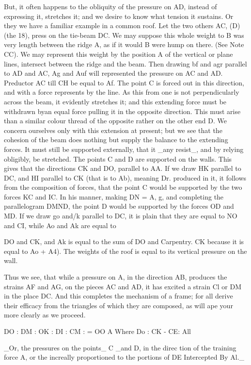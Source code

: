 \documentclass{article}
\begin{document}
But, it often happens to the obliquity of the pressure on AD, instead of expressing it, stretches it; and we desire to know what tension it sustains. Or they we have a familiar example in a common roof. Let the two others AC, (D) (the 18), press on the tie-beam DC. We may suppose this whole weight to B was very length between the ridge A, as if it would B were hump on there. (See Note CC). We may represent this weight by the position A of the vertical or plane lines, intersect between the ridge and the beam. Then drawing bf and agr parallel to AD and AC, Ag and Auf will represented the pressure on AC and AD. Preductor AC till CH be equal to Af. The point C is forced out in this direction, and with a force represents by the line. As this from one is not perpendicularly across the beam, it evidently stretches it; and this extending force must be withdrawn byan equal force pulling it in the opposite direction. This must arise than a similar colour thread of the opposite rather on the other end D. We concern ourselves only with this extension at present; but we see that the cohesion of the beam does nothing but supply the balance to the extending forces. It must still be supported externally, that it \_any resist\_, and by relying obligibly, be stretched. The points C and D are supported on the walls. This gives that the directions CK and DO, parallel to AA. If we draw HK parallel to DC, and HI parallel to CK (that is to Ab), meaning Dr. produced in it, it follows from the composition of forces, that the point C would be supported by the two forces KC and IC. In his manner, making DN = A, g, and completing the parallelogram DMND, the point D would be supported by the forces OD and MD. If we draw go and/k parallel to DC, it is plain that they are equal to NO and CI, while Ao and Ak are equal to

DO and CK, and Ak is equal to the sum of DO and Carpentry. CK because it is equal to Ao + A4). The weights of the roof is equal to its vertical pressure on the wall.

Thus we see, that while a pressure on A, in the direction AB, produces the strains AF and AG, on the pieces AC and AD, it has excited a strain Cl or DM in the place DC. And this completes the mechanism of a frame; for all derive their efficacy from the triangles of which they are composed, as will ape your more clearly as we proceed.

DO : DM : OK : DI : CM : = OO A Where Do : CK - CE: All

\_Or, the pressures on the points\_ C \_and D, in the direc tion of the training force A, or the increally proportioned to the portions of DE Intercepted By Al.\_
\end{document}
